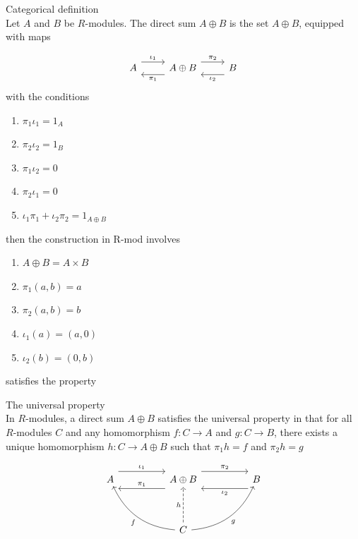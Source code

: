 \documentclass{report}
\begin{document}
\begin{definition}{Categorical definition}{}\\
Let $A$ and $B$ be $R$-modules. The direct sum $A \oplus B$ is the set $A \oplus B$, equipped with maps

\[
\begin{tikzcd}
A \arrow[r, shift left=1.5ex, "\iota_1"] & A \oplus B \arrow[l, shift left=1.5ex, "\pi_1"] \arrow[r, shift left=1.5ex, "\pi_2"] & B \arrow[l, shift left=1.5ex, "\iota_2"]
\end{tikzcd}
\]
with the conditions
\begin{enumerate}
    \item $\pi _1 \iota _1=1_A$
    \item $\pi _2 \iota _2=1_B$
    \item $\pi _1 \iota _2=0$
    \item $\pi _2 \iota _1=0$
    \item $\iota _1 \pi_1 + \iota _2\pi _2=1_{A\oplus B}$
\end{enumerate}
then the construction in R-mod involves
\begin{enumerate}
    \item $A \oplus B = A \times B$
    \item $\pi _1(a,b)=a$
    \item $\pi _2(a,b)=b$
    \item $\iota _1(a)=(a,0)$
    \item $\iota _2(b)=(0,b)$
\end{enumerate}
satisfies the property
\end{definition}

\newpage
\begin{thm}{The universal property}{}\\
    In $R$-modules, a direct sum $A \oplus B$ satisfies the universal property in that for all $R$-modules $C$ and any homomorphism $f:C \to A$ and $g:C \to B$, there exists a unique homomorphism $h:C \to A \oplus B$ such that $\pi _1 h=f$ and $\pi _2h = g$


\[
\begin{tikzcd}[column sep=huge, row sep=huge]
A \arrow[r, shift left=2ex, "\iota_1"] & 
A \oplus B \arrow[l, shift left=2ex, "\pi_1"'] \arrow[r, shift left=2ex, "\pi_2"] & 
B \arrow[l, shift left=2ex, "\iota_2"] \\
& C \arrow[ul, bend left=30, "f"] \arrow[u, dashed, "h"] \arrow[ur, bend right=30, "g"'] &
\end{tikzcd}
\]

\end{thm}
\end{document}
